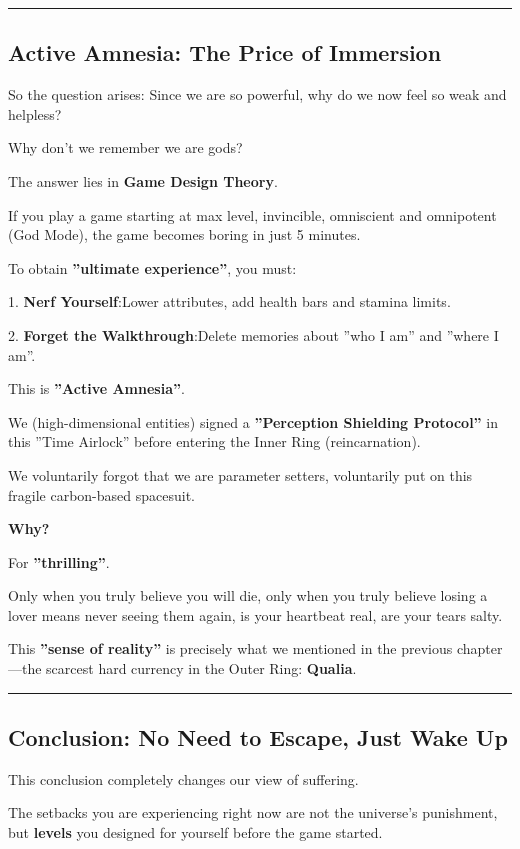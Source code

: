 \hrule

\subsection{Active Amnesia: The Price of Immersion}

So the question arises: Since we are so powerful, why do we now feel so weak and helpless?

Why don't we remember we are gods?

The answer lies in \textbf{Game Design Theory}.

If you play a game starting at max level, invincible, omniscient and omnipotent (God Mode), the game becomes boring in just 5 minutes.

To obtain \textbf{''ultimate experience''}, you must:

1.  \textbf{Nerf Yourself}:Lower attributes, add health bars and stamina limits.

2.  \textbf{Forget the Walkthrough}:Delete memories about ''who I am'' and ''where I am''.

This is \textbf{''Active Amnesia''}.

We (high-dimensional entities) signed a \textbf{''Perception Shielding Protocol''} in this ''Time Airlock'' before entering the Inner Ring (reincarnation).

We voluntarily forgot that we are parameter setters, voluntarily put on this fragile carbon-based spacesuit.

\textbf{Why?}

For \textbf{''thrilling''}.

Only when you truly believe you will die, only when you truly believe losing a lover means never seeing them again, is your heartbeat real, are your tears salty.

This \textbf{''sense of reality''} is precisely what we mentioned in the previous chapter---the scarcest hard currency in the Outer Ring: \textbf{Qualia}.

\hrule

\subsection{Conclusion: No Need to Escape, Just Wake Up}

This conclusion completely changes our view of suffering.

The setbacks you are experiencing right now are not the universe's punishment, but \textbf{levels} you designed for yourself before the game started.

